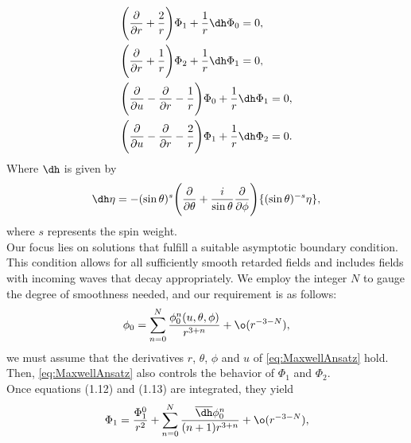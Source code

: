 \begin{align}\label{eq:MaxwellEqns}
  & \Biggl(\frac{\partial}{\partial r} + \frac{2}{r}\Biggr)\Phi_{1}  + \frac{1}{r}\dh \Phi_{0} = 0, \\ 
  & \Biggl(\frac{\partial}{\partial r} + \frac{1}{r}\Biggr)\Phi_{2}  + \frac{1}{r}\dh \Phi_{1} = 0, \\ 
  & \Biggl(\frac{\partial}{\partial u} - \frac{\partial}{\partial r} - \frac{1}{r}\Biggr)\Phi_{0}  + \frac{1}{r}\dh \Phi_{1} = 0, \\ 
  & \Biggl(\frac{\partial}{\partial u} - \frac{\partial}{\partial r} - \frac{2}{r}\Biggr)\Phi_{1}  + \frac{1}{r}\dh \Phi_{2} = 0. 
\end{align}
Where $\dh$ is given by $$\dh \eta = -(\sin \theta)^{s}\Biggl(\frac{\partial}{\partial \theta} + \frac{i}{\sin \theta}\frac{\partial}{\partial \phi}\Biggr)\{(\sin \theta)^{-s}\eta\},$$ where $s$ represents the spin weight.
\\
Our focus lies on solutions that fulfill a suitable asymptotic boundary condition. This condition allows for all sufficiently smooth retarded fields and includes fields with incoming waves that decay appropriately. We employ the integer $N$ to gauge the degree of smoothness needed, and our requirement is as follows:
\begin{equation}\label{eq:MaxwellAnsatz}
  \phi_{0}=\sum_{n=0}^{N}\frac{\phi_{0}^{n}(u,\theta,\phi)}{r^{3+n}}+\o(r^{-3-N}),
\end{equation}
we must assume that the derivatives $r$, $\theta$, $\phi$ and $u$ of \eqref{eq:MaxwellAnsatz} hold. Then, \eqref{eq:MaxwellAnsatz} also controls the behavior of $\Phi_{1}$ and $\Phi_{2}$.\\
Once equations (1.12) and (1.13) are integrated, they yield
\begin{equation}\label{eq:Phi1}
  \Phi_{1} = \frac{\Phi_{1}^{0}}{r^2} + \sum_{n=0}^{N}\frac{\overline{\dh} \phi_{0}^{n}}{(n+1)r^{3+n}}+\o(r^{-3-N}),
\end{equation}


